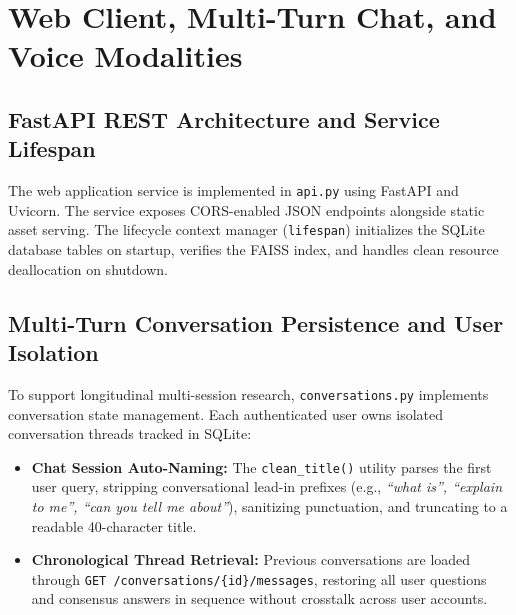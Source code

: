 \section{Web Client, Multi-Turn Chat, and Voice Modalities}
\label{sec:web_interface}

\subsection{FastAPI REST Architecture and Service Lifespan}
The web application service is implemented in \texttt{api.py} using FastAPI and Uvicorn. The service exposes CORS-enabled JSON endpoints alongside static asset serving. The lifecycle context manager (\texttt{lifespan}) initializes the SQLite database tables on startup, verifies the FAISS index, and handles clean resource deallocation on shutdown.

\subsection{Multi-Turn Conversation Persistence and User Isolation}
To support longitudinal multi-session research, \texttt{conversations.py} implements conversation state management. Each authenticated user owns isolated conversation threads tracked in SQLite:
\begin{itemize}
    \item \textbf{Chat Session Auto-Naming:} The \texttt{clean\_title()} utility parses the first user query, stripping conversational lead-in prefixes (e.g., \emph{``what is'', ``explain to me'', ``can you tell me about''}), sanitizing punctuation, and truncating to a readable 40-character title.
    \item \textbf{Chronological Thread Retrieval:} Previous conversations are loaded through \texttt{GET /conversations/\{id\}/messages}, restoring all user questions and consensus answers in sequence without crosstalk across user accounts.
\end{itemize}

